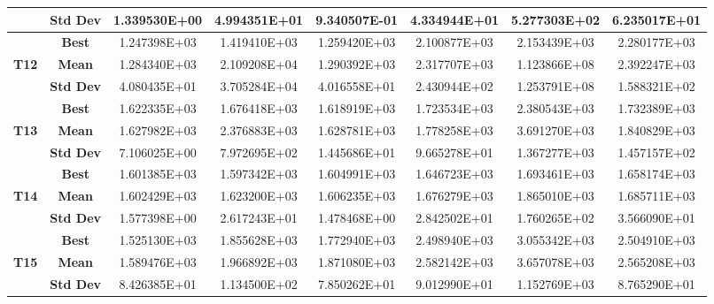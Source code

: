 \documentclass{llncs}
\begin{document}
\begin{table}[htbp]
{\begin{tabular}{|c|c|c|c|c|c|c|c|}
		\multicolumn{ 1}{|c|}{} & \textbf{Std Dev} & 1.339530E+00 & 4.994351E+01 & 9.340507E-01 & 4.334944E+01 & 5.277303E+02 & 6.235017E+01 \\ \hline
		\multicolumn{ 1}{|c|}{} & \textbf{Best} & 1.247398E+03 & 1.419410E+03 & 1.259420E+03 & 2.100877E+03 & 2.153439E+03 & 2.280177E+03 \\ \cline{ 2- 8}
		\multicolumn{ 1}{|c|}{\textbf{T12}} & \textbf{Mean} & 1.284340E+03 & 2.109208E+04 & 1.290392E+03 & 2.317707E+03 & 1.123866E+08 & 2.392247E+03 \\ \cline{ 2- 8}
		\multicolumn{ 1}{|c|}{} & \textbf{Std Dev} & 4.080435E+01 & 3.705284E+04 & 4.016558E+01 & 2.430944E+02 & 1.253791E+08 & 1.588321E+02 \\ \hline
		\multicolumn{ 1}{|c|}{} & \textbf{Best} & 1.622335E+03 & 1.676418E+03 & 1.618919E+03 & 1.723534E+03 & 2.380543E+03 & 1.732389E+03 \\ \cline{ 2- 8}
		\multicolumn{ 1}{|c|}{\textbf{T13}} & \textbf{Mean} & 1.627982E+03 & 2.376883E+03 & 1.628781E+03 & 1.778258E+03 & 3.691270E+03 & 1.840829E+03 \\ \cline{ 2- 8}
		\multicolumn{ 1}{|c|}{} & \textbf{Std Dev} & 7.106025E+00 & 7.972695E+02 & 1.445686E+01 & 9.665278E+01 & 1.367277E+03 & 1.457157E+02 \\ \hline
		\multicolumn{ 1}{|c|}{} & \textbf{Best} & 1.601385E+03 & 1.597342E+03 & 1.604991E+03 & 1.646723E+03 & 1.693461E+03 & 1.658174E+03 \\ \cline{ 2- 8}
		\multicolumn{ 1}{|c|}{\textbf{T14}} & \textbf{Mean} & 1.602429E+03 & 1.623200E+03 & 1.606235E+03 & 1.676279E+03 & 1.865010E+03 & 1.685711E+03 \\ \cline{ 2- 8}
		\multicolumn{ 1}{|c|}{} & \textbf{Std Dev} & 1.577398E+00 & 2.617243E+01 & 1.478468E+00 & 2.842502E+01 & 1.760265E+02 & 3.566090E+01 \\ \hline
		\multicolumn{ 1}{|c|}{} & \textbf{Best} & 1.525130E+03 & 1.855628E+03 & 1.772940E+03 & 2.498940E+03 & 3.055342E+03 & 2.504910E+03 \\ \cline{ 2- 8}
		\multicolumn{ 1}{|c|}{\textbf{T15}} & \textbf{Mean} & 1.589476E+03 & 1.966892E+03 & 1.871080E+03 & 2.582142E+03 & 3.657078E+03 & 2.565208E+03 \\ \cline{ 2- 8}
		\multicolumn{ 1}{|c|}{} & \textbf{Std Dev} & 8.426385E+01 & 1.134500E+02 & 7.850262E+01 & 9.012990E+01 & 1.152769E+03 & 8.765290E+01 \\ \hline
	\end{tabular}}
	\label{tbl2}
\end{table}



\end{document}
